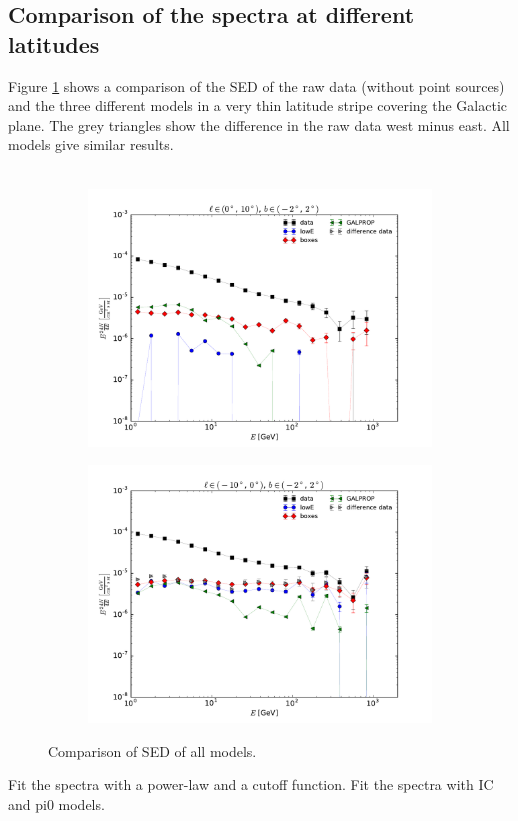 \subsection{Comparison of the spectra at different latitudes}

Figure \ref{fig:SED_all} shows a comparison of the SED of the raw data (without point sources) and the three different models in a very thin latitude stripe covering the Galactic plane. The grey triangles show the difference in the raw data west minus east. All models give similar results. \\
\\
\begin{figure}[h!]
    \begin{subfigure}{0.5\textwidth}
        \includegraphics[width=\textwidth]{plots/SED_all_models_source_l=5_b=0.pdf}
    \end{subfigure} 
    \begin{subfigure}{0.5\textwidth}
        \includegraphics[width=\textwidth]{plots/SED_all_models_source_l=-5_b=0.pdf}
    \end{subfigure}
  	\caption{Comparison of SED of all models.}
  	\label{fig:SED_all}
\end{figure}
Fit the spectra with a power-law and a cutoff function.
Fit the spectra with IC and pi0 models.

